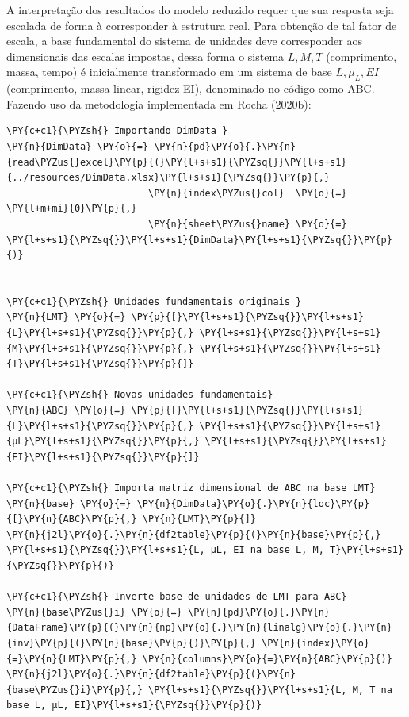 A interpretação dos resultados do modelo reduzido requer que sua
resposta seja escalada de forma à corresponder à estrutura real. Para
obtenção de tal fator de escala, a base fundamental do sistema de
unidades deve corresponder aos dimensionais das escalas impostas, dessa
forma o sistema \(L, M, T\) (comprimento, massa, tempo) é inicialmente
transformado em um sistema de base \(L, \mu_L, EI\) (comprimento, massa
linear, rigidez EI), denominado no código como ABC. Fazendo uso da
metodologia implementada em Rocha (2020b):

    \begin{tcolorbox}[breakable, size=fbox, boxrule=1pt, pad at break*=1mm,colback=cellbackground, colframe=cellborder]
\begin{Verbatim}[commandchars=\\\{\}]
\PY{c+c1}{\PYZsh{} Importando DimData }
\PY{n}{DimData} \PY{o}{=} \PY{n}{pd}\PY{o}{.}\PY{n}{read\PYZus{}excel}\PY{p}{(}\PY{l+s+s1}{\PYZsq{}}\PY{l+s+s1}{../resources/DimData.xlsx}\PY{l+s+s1}{\PYZsq{}}\PY{p}{,} 
                         \PY{n}{index\PYZus{}col}  \PY{o}{=}  \PY{l+m+mi}{0}\PY{p}{,}
                         \PY{n}{sheet\PYZus{}name} \PY{o}{=} \PY{l+s+s1}{\PYZsq{}}\PY{l+s+s1}{DimData}\PY{l+s+s1}{\PYZsq{}}\PY{p}{)}


\PY{c+c1}{\PYZsh{} Unidades fundamentais originais }
\PY{n}{LMT} \PY{o}{=} \PY{p}{[}\PY{l+s+s1}{\PYZsq{}}\PY{l+s+s1}{L}\PY{l+s+s1}{\PYZsq{}}\PY{p}{,} \PY{l+s+s1}{\PYZsq{}}\PY{l+s+s1}{M}\PY{l+s+s1}{\PYZsq{}}\PY{p}{,} \PY{l+s+s1}{\PYZsq{}}\PY{l+s+s1}{T}\PY{l+s+s1}{\PYZsq{}}\PY{p}{]}

\PY{c+c1}{\PYZsh{} Novas unidades fundamentais}
\PY{n}{ABC} \PY{o}{=} \PY{p}{[}\PY{l+s+s1}{\PYZsq{}}\PY{l+s+s1}{L}\PY{l+s+s1}{\PYZsq{}}\PY{p}{,} \PY{l+s+s1}{\PYZsq{}}\PY{l+s+s1}{μL}\PY{l+s+s1}{\PYZsq{}}\PY{p}{,} \PY{l+s+s1}{\PYZsq{}}\PY{l+s+s1}{EI}\PY{l+s+s1}{\PYZsq{}}\PY{p}{]} 

\PY{c+c1}{\PYZsh{} Importa matriz dimensional de ABC na base LMT}
\PY{n}{base} \PY{o}{=} \PY{n}{DimData}\PY{o}{.}\PY{n}{loc}\PY{p}{[}\PY{n}{ABC}\PY{p}{,} \PY{n}{LMT}\PY{p}{]}
\PY{n}{j2l}\PY{o}{.}\PY{n}{df2table}\PY{p}{(}\PY{n}{base}\PY{p}{,} \PY{l+s+s1}{\PYZsq{}}\PY{l+s+s1}{L, μL, EI na base L, M, T}\PY{l+s+s1}{\PYZsq{}}\PY{p}{)}

\PY{c+c1}{\PYZsh{} Inverte base de unidades de LMT para ABC}
\PY{n}{base\PYZus{}i} \PY{o}{=} \PY{n}{pd}\PY{o}{.}\PY{n}{DataFrame}\PY{p}{(}\PY{n}{np}\PY{o}{.}\PY{n}{linalg}\PY{o}{.}\PY{n}{inv}\PY{p}{(}\PY{n}{base}\PY{p}{)}\PY{p}{,} \PY{n}{index}\PY{o}{=}\PY{n}{LMT}\PY{p}{,} \PY{n}{columns}\PY{o}{=}\PY{n}{ABC}\PY{p}{)}
\PY{n}{j2l}\PY{o}{.}\PY{n}{df2table}\PY{p}{(}\PY{n}{base\PYZus{}i}\PY{p}{,} \PY{l+s+s1}{\PYZsq{}}\PY{l+s+s1}{L, M, T na base L, μL, EI}\PY{l+s+s1}{\PYZsq{}}\PY{p}{)}
\end{Verbatim}
\end{tcolorbox}

